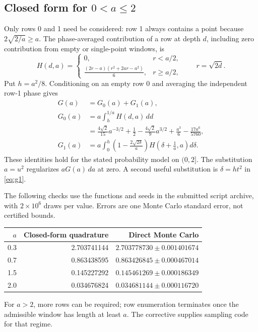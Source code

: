 \documentclass[11pt,a4paper]{article}
\begin{document}
\subsection{Closed form for \texorpdfstring{$0<a\leq2$}{0 < a <= 2}}
Only rows 0 and 1 need be considered: row 1 always contains a point because $2\sqrt{2/a}\geq a$. The phase-averaged contribution of a row at depth $d$, including zero contribution from empty or single-point windows, is
\[
 H(d,a)=\begin{cases}
 0,&r<a/2,\\[2pt]
 \displaystyle\frac{(2r-a)(r^2+2ar-a^2)}6,&r\geq a/2,
 \end{cases}\qquad r=\sqrt{2d}.
\]
Put $h=a^2/8$. Conditioning on an empty row 0 and averaging the independent row-1 phase gives
\begin{align}
 G(a)&=G_0(a)+G_1(a),\\
 G_0(a)&=a\int_h^{1/a}H(d,a)\,dd\nonumber\\
 &=\frac{4\sqrt2}{15}a^{-3/2}+\frac12
   -\frac{4\sqrt2}{9}a^{3/2}+\frac{a^3}{6}
   -\frac{17a^6}{5760},\label{eq:g0}\\
 G_1(a)&=a\int_0^h\left(1-\frac{2\sqrt{2\delta}}a\right)
                     H\left(\delta+\frac1a,a\right)d\delta.
 \label{eq:g1}
\end{align}
These identities hold for the stated probability model on $(0,2]$. The substitution $a=u^2$ regularizes $aG(a)\,da$ at zero. A second useful substitution is $\delta=ht^2$ in \eqref{eq:g1}.

The following checks use the functions and seeds in the submitted script archive, with $2\times10^6$ draws per value. Errors are one Monte Carlo standard error, not certified bounds.
\begin{center}
\begin{tabular}{rrr}
\toprule
$a$ & Closed-form quadrature & Direct Monte Carlo\\
\midrule
0.3 & 2.703741144 & $2.703778730\pm0.001401674$\\
0.7 & 0.863438595 & $0.863426845\pm0.000467014$\\
1.5 & 0.145227292 & $0.145461269\pm0.000186349$\\
2.0 & 0.034676824 & $0.034681144\pm0.000116720$\\
\bottomrule
\end{tabular}
\end{center}
For $a>2$, more rows can be required; row enumeration terminates once the admissible window has length at least $a$. The corrective supplies sampling code for that regime.
\end{document}
